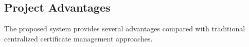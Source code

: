 \subsection{Project Advantages}

    The proposed system provides several advantages compared with traditional centralized certificate management approaches.

    
